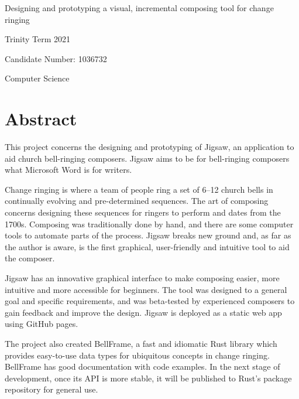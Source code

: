 \documentclass[12pt]{article}
\begin{document}
\begin{titlepage}
    \begin{center}
        \vspace*{2in}
        \Huge
        Designing and prototyping a visual, incremental composing tool for change ringing
        \Large

        Trinity Term 2021

        Candidate Number: 1036732

        Computer Science
    \end{center}
\end{titlepage}



\pagebreak

\section*{Abstract}

This project concerns the designing and prototyping of Jigsaw, an application to aid church
bell-ringing composers.  Jigsaw aims to be for bell-ringing composers what Microsoft Word is for
writers.

Change ringing is where a team of people ring a set of 6--12 church bells in continually evolving and
pre-determined sequences. The art of composing concerns designing these sequences for ringers to
perform and dates from the 1700s.  Composing was traditionally done by hand, and there are some
computer tools to automate parts of the process. Jigsaw breaks new ground and, as far as the author
is aware, is the first graphical, user-friendly and intuitive tool to aid the composer.

Jigsaw has an innovative graphical interface to make composing easier, more intuitive and more
accessible for beginners. The tool was designed to a general goal and specific requirements, and was
beta-tested by experienced composers to gain feedback and improve the design.  Jigsaw is deployed as
a static web app using GitHub pages.

The project also created BellFrame, a fast and idiomatic Rust library which provides easy-to-use
data types for ubiquitous concepts in change ringing. BellFrame has good documentation with code
examples. In the next stage of development, once its API is more stable, it will be published to
Rust's package repository for general use.



\pagebreak

\tableofcontents
\end{document}
